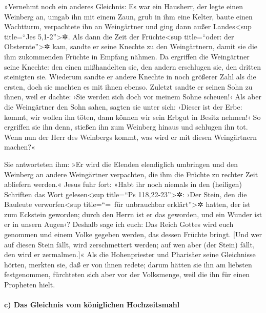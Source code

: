  »Vernehmt noch ein anderes Gleichnis: Es war ein
Hausherr, der legte einen Weinberg an, umgab ihn mit einem Zaun, grub in
ihm eine Kelter, baute einen Wachtturm, verpachtete ihn an Weingärtner
und ging dann außer Landes\textless sup title=``Jes
5,1-2''\textgreater✲.  Als dann die Zeit der
Früchte\textless sup title=``oder: der Obsternte''\textgreater✲ kam,
sandte er seine Knechte zu den Weingärtnern, damit sie die ihm
zukommenden Früchte in Empfang nähmen.  Da ergriffen die
Weingärtner seine Knechte: den einen mißhandelten sie, den andern
erschlugen sie, den dritten steinigten sie.  Wiederum
sandte er andere Knechte in noch größerer Zahl als die ersten, doch sie
machten es mit ihnen ebenso.  Zuletzt sandte er seinen
Sohn zu ihnen, weil er dachte: ›Sie werden sich doch vor meinem Sohne
scheuen!‹  Als aber die Weingärtner den Sohn sahen,
sagten sie unter sich: ›Dieser ist der Erbe: kommt, wir wollen ihn
töten, dann können wir sein Erbgut in Besitz nehmen!‹  So
ergriffen sie ihn denn, stießen ihn zum Weinberg hinaus und schlugen ihn
tot.  Wenn nun der Herr des Weinbergs kommt, was wird er
mit diesen Weingärtnern machen?«

 Sie antworteten ihm: »Er wird die Elenden elendiglich
umbringen und den Weinberg an andere Weingärtner verpachten, die ihm die
Früchte zu rechter Zeit abliefern werden.«  Jesus fuhr
fort: »Habt ihr noch niemals in den (heiligen) Schriften das Wort
gelesen\textless sup title=``Ps 118,22-23''\textgreater✲: ›Der Stein,
den die Bauleute verworfen\textless sup title=``=~für unbrauchbar
erklärt''\textgreater✲ hatten, der ist zum Eckstein geworden; durch den
Herrn ist er das geworden, und ein Wunder ist er in unsern Augen‹?
 Deshalb sage ich euch: Das Reich Gottes wird euch
genommen und einem Volke gegeben werden, das dessen Früchte bringt.
 {[}Und wer auf diesen Stein fällt, wird zerschmettert
werden; auf wen aber (der Stein) fällt, den wird er zermalmen.{]}«
 Als die Hohenpriester und Pharisäer seine Gleichnisse
hörten, merkten sie, daß er von ihnen redete;  darum
hätten sie ihn am liebsten festgenommen, fürchteten sich aber vor der
Volksmenge, weil die ihn für einen Propheten hielt.

\hypertarget{c-das-gleichnis-vom-kuxf6niglichen-hochzeitsmahl}{%
\paragraph{c) Das Gleichnis vom königlichen
Hochzeitsmahl}\label{c-das-gleichnis-vom-kuxf6niglichen-hochzeitsmahl}}

